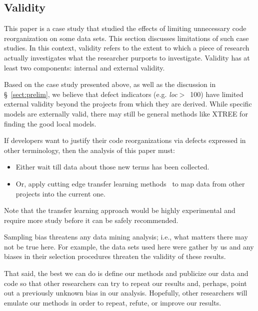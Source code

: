 \documentclass[sigconf, proceedings, 9pt]{acmart}
\newcommand{\tion}[1]{\S~\ref{sect:#1}}
\begin{document}
\subsection{Validity}

This paper is a case study that studied the effects of  limiting 
unnecessary code reorganization on some data sets. This section discusses 
limitations of such case studies. In this context, validity refers to the 
extent to which a piece of research actually
investigates what the researcher purports to investigate.
Validity has at least two components: internal and
external validity.


Based on the case study presented above,
as well as the discussion in \tion{prelim},
we believe that defect indicators (e.g. \mbox{{\em loc}$>$ 100})
have limited external validity beyond the projects from which they are 
derived. While specific models are externally valid,
there may still be general methods like XTREE for finding the good local 
models.

If developers want to justify their code reorganizations
via defects expressed in other terminology,
then the  analysis of this paper must:
\begin{itemize}
	\item Either wait till
	data about those new
	terms has been collected.
	\item Or, apply cutting edge transfer learning
	methods~\cite{Nam15,Jing15, krishna16} to map data from other projects
	into the current one.
\end{itemize}

Note that the transfer learning approach would
be highly experimental and require more study
before it can be safely recommended.

Sampling bias threatens any data mining analysis; i.e., what matters
there may not be true here. For example, the data sets used here were gather by 
us and any biases in their selection procedures threaten the validity of these 
results.

That said, the best we can do is define our methods and publicize our data and 
code so that other researchers can try to repeat our results and, perhaps, 
point out a previously unknown bias in our analysis. Hopefully, other 
researchers will emulate our methods in order to repeat, refute, or improve our 
results.
\end{document}

